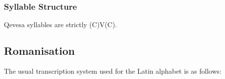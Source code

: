 \documentclass[grammar]{subfiles}
\begin{document}
%

\subsubsection{Syllable Structure}
\label{sssec:syllables}

Qevesa syllables are strictly (C)V(C).

\ToBeWritten

\newpage

\subsection{Romanisation}
\label{ssec:romanisation}

The usual transcription system used for the Latin alphabet is as follows:
\end{document}
